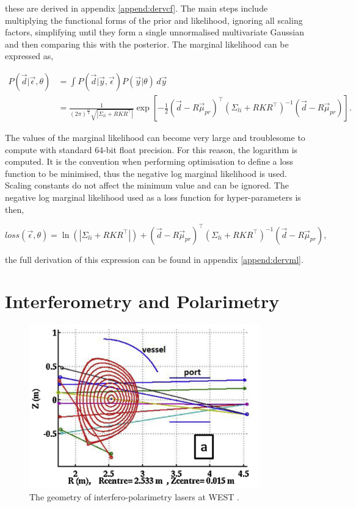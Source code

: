 \noindent these are derived in appendix \ref{append:dervcf}. The main steps include multiplying the functional forms of the prior and likelihood, ignoring all scaling factors, simplifying until they form a single unnormalised multivariate Gaussian and then comparing this with the posterior. The marginal likelihood can be expressed as,

\begin{equation}
\begin{aligned}
 P(\vec d|\vec\epsilon,\theta) &= \int P(\vec{d}|\vec{y},\vec\epsilon)P(\vec{y}|\theta)  \, d\vec y \\
 &= \frac{1}{(2\pi)^{\frac{m}{2}} \sqrt{|\Sigma_{li} + RKR^\top|}} \exp\left[ -\frac{1}{2} (\vec{d} - R\vec{\mu}_{pr})^{\top} (\Sigma_{li} + R K R^{\top})^{-1} (\vec{d} - R\vec{\mu}_{pr}) \right].
\end{aligned}
\end{equation}

\noindent The values of the marginal likelihood can become very large and troublesome to compute with standard 64-bit float precision. For this reason, the logarithm is computed. It is the convention when performing optimisation to define a loss function to be minimised, thus the negative log marginal likelihood is used. Scaling constants do not affect the minimum value and can be ignored. The negative log marginal likelihood used as a loss function for hyper-parameters is then,

\begin{equation}
loss(\vec \epsilon,\theta) = \ln(|\Sigma_{li}+RKR^\top|) +  (\vec{d} - R\vec{\mu}_{pr})^{\top} (\Sigma_{li} + R K R^{\top})^{-1} (\vec{d} - R\vec{\mu}_{pr}),
\end{equation}

\noindent the full derivation of this expression can be found in appendix \ref{append:dervml}.


\section{Interferometry and Polarimetry}

\begin{figure}[H]
  \centering
  \includegraphics[width=10cm]{images/interfgeo.png}
  \caption{The geometry of interfero-polarimetry lasers at WEST \cite{westinterfero}.}
  \label{fig:interfgeo}
\end{figure}

